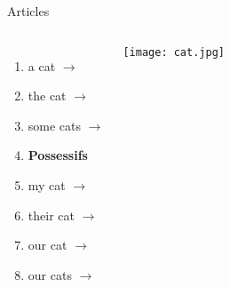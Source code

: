 \begin{frame}{Articles }
  \begin{columns}
      \begin{enumerate}
        \item a cat $\to$ \underline{}
        \item the cat $\to$ \underline{}
        \item some cats $\to$ \underline{}
        \item[] \textbf{Possessifs}
        \item my cat $\to$ \underline{}
        \item their cat $\to$ \underline{}
        \item our cat $\to$ \underline{}
        \item our cat\alert{s} $\to$ \underline{}
      \end{enumerate}
      \texttt{[image: cat.jpg]}
  \end{columns}
\end{frame}